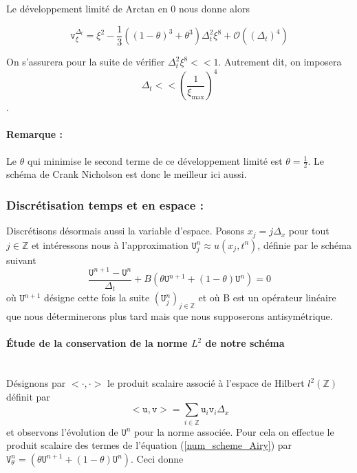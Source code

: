 \documentclass[12pt,a4paper]{article}
\numberwithin{equation}{section}
\begin{document}
Le développement limité de Arctan en 0 nous donne alors

\begin{equation}
    \texttt{v}_\xi^{\Delta_t} = \xi^2 - \frac{1}{3}\left((1-\theta)^3+\theta^3\right)\Delta_t^2\xi^8 + \mathcal{O}((\Delta_t)^4) 
\end{equation}

On s'assurera pour la suite de vérifier $\Delta_t^2\xi^8 << 1$. Autrement dit, on imposera $$\Delta_t << \left(\frac{1}{\xi_\text{max}}\right)^4$$.
\paragraph{Remarque :} Le $\theta$ qui minimise le second terme de ce développement limité est $\theta = \frac{1}{2}$. Le schéma de Crank Nicholson est donc le meilleur ici aussi.

\subsubsection{Discrétisation temps et en espace :}
Discrétisons désormais aussi la variable d'espace. Posons $x_j = j\Delta_x$ pour tout $j\in\mathbb{Z}$ et intéressons nous à l'approximation $\texttt{U}^n_j \approx u(x_j,t^n)$, définie par le schéma suivant
\begin{equation}
\frac{\texttt{U}^{n+1}-\texttt{U}^n}{\Delta_t} + B(\theta\texttt{U}^{n+1} + (1-\theta)\texttt{U}^{n}) = 0 \label{num_scheme_Airy}
\end{equation}
où $\texttt{U}^{n+1}$ désigne cette fois la suite $(\texttt{U}^n_j)_{j\in\mathbb{Z}}$ et où B est un opérateur linéaire que nous déterminerons plus tard mais que nous supposerons antisymétrique.\\

\paragraph{Étude de la conservation de la norme $L^2$ de notre schéma}\,\\

Désignons par $<\cdot,\cdot>$ le produit scalaire associé à l'espace de Hilbert $l^2(\mathbb{Z})$ définit par $$<\texttt{u},\texttt{v} > = \sum\limits_{i\in\mathbb{Z}}\texttt{u}_i\texttt{v}_i\Delta_x$$ et observons l'évolution de $\texttt{U}^n$ pour la norme associée. Pour cela on effectue le produit scalaire des termes de l'équation (\ref{num_scheme_Airy}) par $ \texttt{V}^n_\theta = (\theta\texttt{U}^{n+1} + (1-\theta)\texttt{U}^{n})$. Ceci donne
\end{document}
